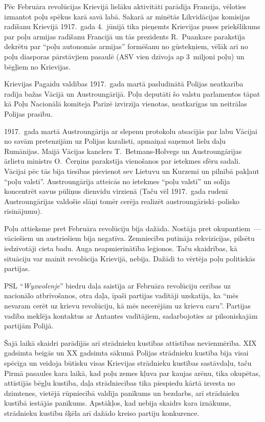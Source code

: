 \documentclass[twoside,a5paper,12pt,fleqn,openany]{extbook}
\newcommand{\pltxti}[1]{\textit{\textpolish{#1}}}
\begin{document}
Pēc Februāra revolūcijas Krievijā lielāku aktivitāti parādīja Francija, vēloties izmantot poļu spēkus karā savā labā. Sakarā ar minētās Likvidācijas komisijas radīšanu Krievijā 1917.~gada 4.~jūnijā tika pieņemts Krievijas puses priekšlikums par poļu armijas radīšanu Francijā un tās prezidents R.~Puankare parakstīja dekrētu par ``poļu autonomās armijas'' formēšanu no gūstekņiem, vēlāk arī no poļu diasporas pārstāvjiem pasaulē (ASV vien dzīvoja ap 3~miljoni poļu) un bēgļiem no Krievijas.

Krievijas Pagaidu valdības 1917.~gada martā pasludinātā Polijas neatkarība radīja bažas Vācijā un Austroungārijā. Poļu deputāti šo valstu parlamentos tāpat kā Poļu Nacionālā komiteja Parīzē izvirzīja vienotas, neatkarīgas un neitrālas Polijas prasību.

1917.~gada martā Austroungārija ar slepenu protokolu atsacījās par labu Vācijai no savām pretenzijām uz Polijas karalisti, apmaiņai saņemot lielu daļu Rumānijas. Maijā Vācijas kanclers T.~Betmans-Holvegs un Austroungārijas ārlietu ministrs O.~Čerņins parakstīja vienošanos par ietekmes sfēru sadali. Vācijai pēc tās bija tiesības pievienot sev Lietuvu un Kurzemi un pilnībā pakļaut ``poļu valsti''. Austroungārija atteicās no ietekmes ``poļu valstī'' un solīja koncentrēt savus pūliņus dienvidu virzienā (Taču vēl 1917.~gada rudenī Austroungārijas valdošie slāņi tomēr cerēja realizēt austroungāriski--polisko risinājumu).

Poļu attieksme pret Februāra revolūciju bija dažāda. Nostāja pret okupantiem~--- vāciešiem un austriešiem bija negatīva. Zemniecību putināja rekvizīcijas, pilsētu iedzīvotāji cieta badu. Auga neapmierinātība leģionos. Taču skaidrības, kā situāciju var mainīt revolūcija Krievijā, nebija. Dažādi to vērtēja poļu politiskās partijas.

PSL ``\pltxti{Wyzwolenje}'' biedru daļa saistīja ar Februāra revolūciju cerības uz nacionālo atbrīvošanos, otra daļa, īpaši partijas vadītāji uzskatīja, ka ``mēs nevaram cerēt uz krievu revolūciju, kā mēs necerējām uz krievu caru''. Partijas vadība meklēja kontaktus ar Antantes vadītājiem, sadarbojoties ar pilsoniskajām partijām Polijā.

Šajā laikā skaidri parādījās arī strādnieku kustības attīstības nevienmērība. XIX gadsimta beigās un XX gadsimta sākumā Polijas strādnieku kustība bija visai spēcīga un veidoja būtisku visas Krievijas strādnieku kustības sastāvdaļu, taču Pirmā pasaules kara laikā, kad poļu zemes kļuva par kaujas arēnu, tika okupētas, attīstījās bēgļu kustība, daļa strādniecības tika piespiedu kārtā izvesta no dzimtenes, vietējā rūpniecībā valdīja panīkums un bezdarbs, arī strādnieku kustībā iestājās panīkums. Apstākļos, kad nebija skaidrs kara iznākums, strādnieku kustību šķēla arī dažādo kreiso partiju konkurence.
\end{document}
